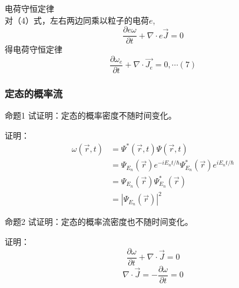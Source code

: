 \begin{frame} 
    \bullet 电荷守恒定律\\ \vspace{0.3em}
    对（4）式，左右两边同乘以粒子的电荷$e$, 
    \begin{equation*}
        \frac{\partial e\omega}{\partial t}+ \nabla \cdot e\vec{J}=0
    \end{equation*}  
    得电荷守恒定律
    \begin{equation*}
        \frac{\partial \omega_e}{\partial t}+ \nabla \cdot \vec{J_e}=0, \cdots (7)
    \end{equation*}  
\end{frame}

\begin{frame} 
    \frametitle{定态的概率流}
    \begin{tcolorbox1}{命题1}
        试证明：定态的概率密度不随时间变化。
    \end{tcolorbox1}
    \alert{证明：}
    \begin{equation*}
        \begin{split}
            \omega (\vec{r}, t)&=\Psi^{*}(\vec{r}, t) \Psi(\vec{r}, t) \\
            &=\Psi_{E_n} (\vec{r} ) e^{-iE_n t/\hbar} \Psi_{E_n} ^* (\vec{r} ) e^{iE_n t/\hbar} \\
            &=\Psi_{E_n} (\vec{r} )\Psi_{E_n} ^* (\vec{r} ) \\
            &=|\Psi_{E_n} (\vec{r} )|^2
        \end{split}
    \end{equation*}
\end{frame}

\begin{frame}   
    \begin{tcolorbox1}{命题2}
        试证明：定态的概率流密度也不随时间变化。 
    \end{tcolorbox1}
    \alert{证明：} 
    \begin{equation*}
        \frac{\partial \omega}{\partial t }+ \nabla \cdot \vec{J}=0
    \end{equation*}  
    \to
    \begin{equation*}
        \nabla \cdot \vec{J}=-\frac{\partial \omega}{\partial t}=0
    \end{equation*}  
\end{frame}

